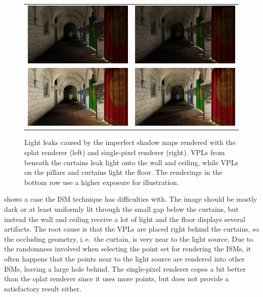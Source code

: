  \begin{figure}[htb]
 \centering
   \begin{tabular}{@{}cc@{}}
     \includegraphics[width=.22\textwidth]{../screenshots/leaks_splat} &
     \includegraphics[width=.22\textwidth]{../screenshots/leaks_single_pixel}\\
     \includegraphics[width=.22\textwidth]{../screenshots/leaks_splat_exposure} &
     \includegraphics[width=.22\textwidth]{../screenshots/leaks_single_pixel_exposure}
   \end{tabular}
   \caption{Light leaks caused by the imperfect shadow maps rendered with the splat renderer (left) and single-pixel renderer (right). VPLs from beneath the curtains leak light onto the wall and ceiling, while VPLs on the pillars and curtains light the floor. The renderings in the bottom row use a higher exposure for illustration. }
   \label{fig:results:leaks}
 \end{figure}


  shows a case the ISM technique has difficulties with. The image should be mostly dark or at least uniformly lit through the small gap below the curtains, but instead the wall and ceiling receive a lot of light and the floor displays several artifacts. The root cause is that the VPLs are placed right behind the curtains, so the occluding geometry, i.\,e.\ the curtain, is very near to the light source. Due to the randomness involved when selecting the point set for rendering the ISMs, it often happens that the points near to the light source are rendered into other ISMs, leaving a large hole behind. The single-pixel renderer copes a bit better than the splat renderer since it uses more points, but does not provide a satisfactory result either.



